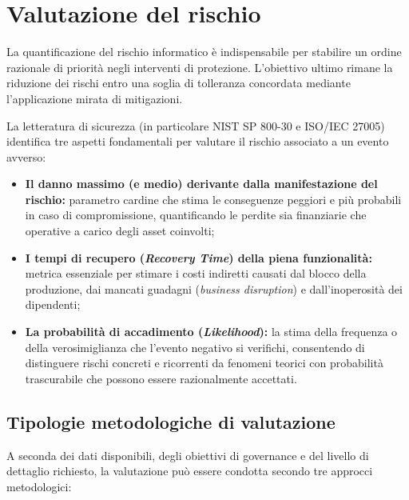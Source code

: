 \documentclass[../../main.tex]{subfiles}
\begin{document}
\section{Valutazione del rischio}
\label{sec:valutazione_rischio}

La quantificazione del rischio informatico è indispensabile per stabilire un ordine razionale di priorità negli interventi di protezione. L'obiettivo ultimo rimane la riduzione dei rischi entro una soglia di tolleranza concordata mediante l'applicazione mirata di mitigazioni.

La letteratura di sicurezza (in particolare NIST SP 800-30 e ISO/IEC 27005) identifica tre aspetti fondamentali per valutare il rischio associato a un evento avverso:
\begin{itemize}
    \item \textbf{Il danno massimo (e medio) derivante dalla manifestazione del rischio:} parametro cardine che stima le conseguenze peggiori e più probabili in caso di compromissione, quantificando le perdite sia finanziarie che operative a carico degli asset coinvolti;
    \item \textbf{I tempi di recupero (\textit{Recovery Time}) della piena funzionalità:} metrica essenziale per stimare i costi indiretti causati dal blocco della produzione, dai mancati guadagni (\textit{business disruption}) e dall'inoperosità dei dipendenti;
    \item \textbf{La probabilità di accadimento (\textit{Likelihood}):} la stima della frequenza o della verosimiglianza che l'evento negativo si verifichi, consentendo di distinguere rischi concreti e ricorrenti da fenomeni teorici con probabilità trascurabile che possono essere razionalmente accettati.
\end{itemize}

\subsection{Tipologie metodologiche di valutazione}
A seconda dei dati disponibili, degli obiettivi di governance e del livello di dettaglio richiesto, la valutazione può essere condotta secondo tre approcci metodologici:
\end{document}
